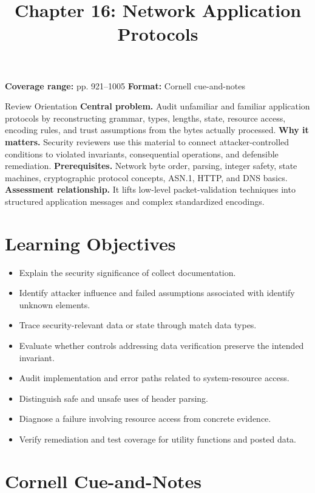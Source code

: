 \documentclass[11pt,letterpaper]{article}
\title{Chapter 16: Network Application Protocols}
\author{}
\date{}
\begin{document}
\maketitle

\begin{center}
\small\color{Meta}\textbf{Coverage range:} pp. 921--1005 \quad\textbullet\quad \textbf{Format:} Cornell cue-and-notes
\end{center}
\vspace{0.25em}
\begin{CornellOverviewBox}{Review Orientation}
\textbf{Central problem.} Audit unfamiliar and familiar application protocols by reconstructing grammar, types, lengths, state, resource access, encoding rules, and trust assumptions from the bytes actually processed.
\textbf{Why it matters.} Security reviewers use this material to connect attacker-controlled conditions to violated invariants, consequential operations, and defensible remediation.
\textbf{Prerequisites.} Network byte order, parsing, integer safety, state machines, cryptographic protocol concepts, ASN.1, HTTP, and DNS basics.
\textbf{Assessment relationship.} It lifts low-level packet-validation techniques into structured application messages and complex standardized encodings.
\end{CornellOverviewBox}
\section{Learning Objectives}
\begin{itemize}
\item Explain the security significance of collect documentation.
\item Identify attacker influence and failed assumptions associated with identify unknown elements.
\item Trace security-relevant data or state through match data types.
\item Evaluate whether controls addressing data verification preserve the intended invariant.
\item Audit implementation and error paths related to system-resource access.
\item Distinguish safe and unsafe uses of header parsing.
\item Diagnose a failure involving resource access from concrete evidence.
\item Verify remediation and test coverage for utility functions and posted data.
\end{itemize}
\section{Cornell Cue-and-Notes}
\end{document}
